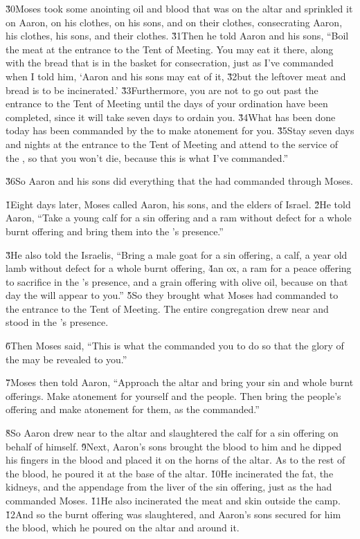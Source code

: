 \v{30}Moses took some anointing oil and blood that was on the altar and sprinkled it on Aaron, on his clothes, on his sons, and on their clothes, consecrating Aaron, his clothes, his sons, and their clothes. \v{31}Then he told Aaron and his sons, ``Boil the meat at the entrance to the Tent of Meeting. You may eat it there, along with the bread that is in the basket for consecration, just as I've commanded when I told him, `Aaron and his sons may eat of it, \v{32}but the leftover meat and bread is to be incinerated.' \v{33}Furthermore, you are not to go out past the entrance to the Tent of Meeting until the days of your ordination have been completed, since it will take seven days to ordain you. \v{34}What has been done today has been commanded by the  to make atonement for you. \v{35}Stay seven days and nights at the entrance to the Tent of Meeting and attend to the service of the , so that you won't die, because this is what I've commanded.''

\v{36}So Aaron and his sons did everything that the  had commanded through Moses.

\v{1}Eight days later, Moses called Aaron, his sons, and the elders of Israel. \v{2}He told Aaron, ``Take a young calf for a sin offering and a ram without defect for a whole burnt offering and bring them into the 's presence.''

\v{3}He also told the Israelis, ``Bring a male goat for a sin offering, a calf, a year old lamb without defect for a whole burnt offering, \v{4}an ox, a ram for a peace offering to sacrifice in the 's presence, and a grain offering with olive oil, because on that day the  will appear to you.'' \v{5}So they brought what Moses had commanded to the entrance to the Tent of Meeting. The entire congregation drew near and stood in the 's presence.

\v{6}Then Moses said, ``This is what the  commanded you to do so that the glory of the  may be revealed to you.''

\v{7}Moses then told Aaron, ``Approach the altar and bring your sin and whole burnt offerings. Make atonement for yourself and the people. Then bring the people's offering and make atonement for them, as the  commanded.''

\v{8}So Aaron drew near to the altar and slaughtered the calf for a sin offering on behalf of himself. \v{9}Next, Aaron's sons brought the blood to him and he dipped his fingers in the blood and placed it on the horns of the altar. As to the rest of the blood, he poured it at the base of the altar. \v{10}He incinerated the fat, the kidneys, and the appendage from the liver of the sin offering, just as the  had commanded Moses. \v{11}He also incinerated the meat and skin outside the camp. \v{12}And so the burnt offering was slaughtered, and Aaron's sons secured for him the blood, which he poured on the altar and around it.

